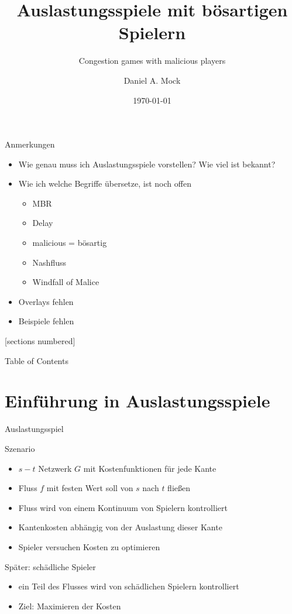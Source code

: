 \documentclass{beamer}
\title{Auslastungsspiele mit bösartigen Spielern}
\subtitle{Congestion games with malicious players}
\date{\today}
\author{Daniel A. Mock}
\institute{Lehrstuhl i1 -- RWTH Aachen}
\begin{document}
\begin{frame}{Anmerkungen}
	\begin{itemize}
		\item Wie genau muss ich Auslastungsspiele vorstellen? Wie viel ist bekannt?
		\item Wie ich welche Begriffe übersetze, ist noch offen
		\begin{itemize}
			\item MBR
			\item Delay
			\item malicious = bösartig
			\item Nashfluss
			\item Windfall of Malice
		\end{itemize}
		\item Overlays fehlen
		\item Beispiele fehlen
	\end{itemize}
\end{frame}

\maketitle

[sections numbered]

\begin{frame}{Table of Contents}
	\tableofcontents
\end{frame}


\section{Einführung in Auslastungsspiele}
\begin{frame}{Auslastungsspiel}
	\begin{block}{Szenario}
		\begin{itemize}
			\item $s-t$ Netzwerk $G$ mit Kostenfunktionen für jede Kante
			\item Fluss $f$ mit festen Wert soll von $s$ nach $t$ fließen
			\item Fluss wird von einem Kontinuum von Spielern kontrolliert
			\item Kantenkosten abhängig von der Auslastung dieser Kante
			\item Spieler versuchen Kosten zu optimieren
		\end{itemize}
	\end{block}

	\begin{block}{Später: schädliche Spieler}
		\begin{itemize}
			\item ein Teil des Flusses wird von schädlichen Spielern kontrolliert
			\item Ziel: Maximieren der Kosten
		\end{itemize}
	\end{block}
\end{frame}
\end{document}
